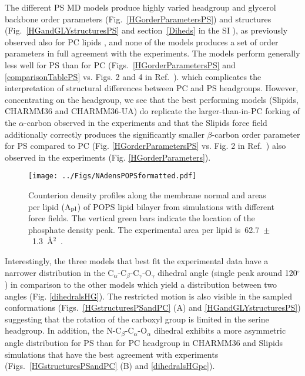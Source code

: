 \documentclass[aps,prl,superscriptaddress,twocolumn]{revtex4}
\begin{document}
The different PS MD models produce highly varied  headgroup and glycerol backbone order parameters (Fig.~\ref{HGorderParametersPS})
and structures (Fig.~\ref{HGandGLYstructuresPS} and section~\ref{Diheds} in the SI ),
as previously observed also for PC lipids \cite{botan15}, and none of the models produces a set of order parameters in full agreement with the experiments.
The models perform generally less well for PS than for PC
(Figs.~\ref{HGorderParametersPS} and \ref{comparisonTablePS} vs. Figs. 2 and 4 in Ref.~\cite{botan15}).
which complicates the interpretation of structural differences between PC and PS headgroups. However, concentrating on the headgroup, we see that the best performing models (Slipids, CHARMM36 and CHARMM36-UA) do replicate the larger-than-in-PC
forking of the $\alpha$-carbon observed in the experiments and that the Slipids force field additionally correctly produces the significantly
smaller $\beta$-carbon order parameter for PS compared to PC (Fig. \ref{HGorderParametersPS} vs. Fig. 2 in Ref.~)
also observed in the experiments (Fig. \ref{HGorderParameters}).

\begin{figure}[!htb]
  \centering
  \texttt{[image: ../Figs/NAdensPOPSformatted.pdf]}
  \caption{\label{NAdensPOPS}
    Counterion density profiles along the membrane normal and areas per lipid (A$_{\rm pl}$)
    of POPS lipid bilayer from simulations with different force fields.
    The vertical green bars indicate the location of the phosphate density peak.
    The experimental area per lipid is~62.7~$\pm$~1.3~\AA$^2$~\cite{pan14}.
  }
\end{figure}


Interestingly, the three models that best fit the experimental data have a narrower distribution in the C$_\alpha$-C$_\beta$-C$_\gamma$-O$_\gamma$
dihedral angle (single peak around 120$^{\circ}$) in comparison to the other models which yield a distribution between two angles (Fig. \ref{dihedralsHG}).
The restricted motion is also visible in the sampled conformations (Figs.~\ref{HGstructuresPSandPC} (A) and \ref{HGandGLYstructuresPS})
suggesting that the rotation of the carboxyl group is limited in the serine headgroup.
In addition, the N-C$_\beta$-C$_\alpha$-O$_\alpha$ dihedral exhibits a more asymmetric
angle distribution for PS than for PC headgroup in
CHARMM36 and Slipids simulations that have the best agreement with experiments
(Figs.~\ref{HGstructuresPSandPC} (B) and \ref{dihedralsHGpc}).
\end{document}
